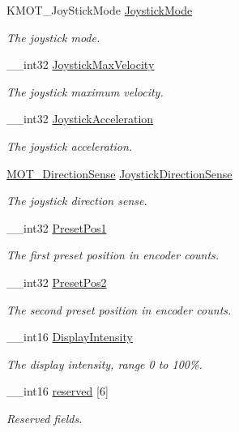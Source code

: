 \begin{DoxyCompactItemize}
\item 
K\+M\+O\+T\+\_\+\+Joy\+Stick\+Mode \hyperlink{struct_k_m_o_t___m_m_i_params_aefe0bf399db7c10d4b35739fd2428183}{Joystick\+Mode}
\begin{DoxyCompactList}\small\item\em The joystick mode. \end{DoxyCompactList}\item 
\+\_\+\+\_\+int32 \hyperlink{struct_k_m_o_t___m_m_i_params_a3b03707b326d8968f146bfa0c7219148}{Joystick\+Max\+Velocity}
\begin{DoxyCompactList}\small\item\em The joystick maximum velocity. \end{DoxyCompactList}\item 
\+\_\+\+\_\+int32 \hyperlink{struct_k_m_o_t___m_m_i_params_aab84bd5687ec88da360d2d369773a943}{Joystick\+Acceleration}
\begin{DoxyCompactList}\small\item\em The joystick acceleration. \end{DoxyCompactList}\item 
\hyperlink{group___common_ga8e20138f47b000995f254ee6262f89d8}{M\+O\+T\+\_\+\+Direction\+Sense} \hyperlink{struct_k_m_o_t___m_m_i_params_a9884f6701df92383e17a8c5795f49762}{Joystick\+Direction\+Sense}
\begin{DoxyCompactList}\small\item\em The joystick direction sense. \end{DoxyCompactList}\item 
\+\_\+\+\_\+int32 \hyperlink{struct_k_m_o_t___m_m_i_params_a8ebcf6fd7bc7880ba193cabcdb8636da}{Preset\+Pos1}
\begin{DoxyCompactList}\small\item\em The first preset position in encoder counts. \end{DoxyCompactList}\item 
\+\_\+\+\_\+int32 \hyperlink{struct_k_m_o_t___m_m_i_params_a139331b9055b97f98f1de1c64f2f4fa2}{Preset\+Pos2}
\begin{DoxyCompactList}\small\item\em The second preset position in encoder counts. \end{DoxyCompactList}\item 
\+\_\+\+\_\+int16 \hyperlink{struct_k_m_o_t___m_m_i_params_a10d63cd6b82f786f9d39299d4a2d05b5}{Display\+Intensity}
\begin{DoxyCompactList}\small\item\em The display intensity, range 0 to 100\%. \end{DoxyCompactList}\item 
\+\_\+\+\_\+int16 \hyperlink{struct_k_m_o_t___m_m_i_params_ada3a9e96b94f041b47292e6e355cdcc2}{reserved} \mbox{[}6\mbox{]}
\begin{DoxyCompactList}\small\item\em Reserved fields. \end{DoxyCompactList}\end{DoxyCompactItemize}


